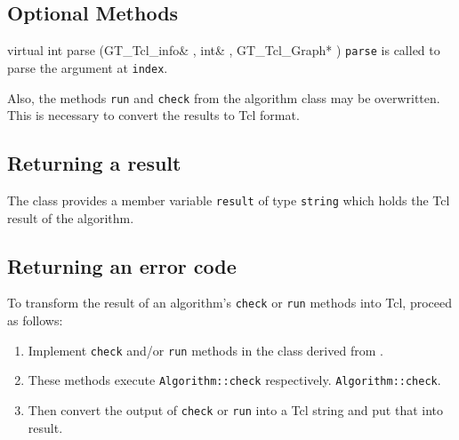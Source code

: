 \documentclass[twoside,fleqn]{report}
\begin{document}
\subsection{Optional Methods}

\begin{Cdefinition}
  \item[virtual int parse (GT\_Tcl\_info\& \Param{info},
  int\& \Param{index},
  GT\_Tcl\_Graph* \Param{g})]
  \texttt{parse} is called to parse the argument at \texttt{index}.
\end{Cdefinition}

Also, the methods \texttt{run} and \texttt{check}
from the algorithm class may be overwritten. This is necessary
to convert the results to Tcl format.

\TBD{}


%
%

\subsection{Returning a result}

The class  provides a member variable
\texttt{result} of type \texttt{string} which holds the Tcl
result of the algorithm.

%
%

\subsection{Returning an error code}

To transform the result of an algorithm's \texttt{check} or
\texttt{run} methods into Tcl, proceed as follows:

\begin{enumerate}

  \item Implement \texttt{check} and/or \texttt{run} methods in the 
  class derived from .

  \item These methods execute \texttt{Algorithm::check} respectively.  
  \texttt{Algorithm::check}.

  \item Then convert the output of \texttt{check} or \texttt{run} into 
  a Tcl string and put that into result.

\end{enumerate}
\end{document}
